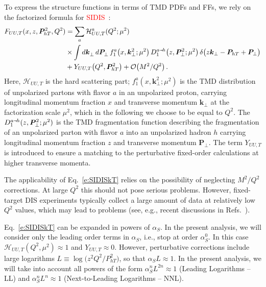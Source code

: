 \documentclass[aps,preprintnumbers,showpacs,nofootinbib,superscriptaddress,floatfix]{revtex4}
\newcommand{\smarrow}{\mbox{\raisebox{-4.5pt}[0pt][0pt]{$\hspace{-1pt} 
		\vec{\phantom{v}}$}}}
\newcommand{\T}{\perp}
\newcommand{\Tperp}{T}
\begin{document}
To express the structure functions in terms of TMD PDFs and FFs, 
we rely on the factorized formula 
for \textcolor{red}{SIDIS}~\cite{Collins:1981uk,Collins:1984kg,Ji:2002aa,Ji:2004wu,%
Collins:2011zzd,Aybat:2011zv,GarciaEchevarria:2011rb,Echevarria:2012pw,%
Collins:2012uy}:  
\begin{align}
\label{e:SIDISkT}
   F_{UU,T}(x,z, \bm{P}_{h \Tperp}^2, Q^2) &= \sum_a \mathcal{H}_{UU,T}^{a}(Q^2;\mu^2) \\ 
      &\times \int d\bm{k}_\T^{} \, d\bm{P}_\T^{} \,  f_1^a\big(x,\bm{k}_{\T}^2; \mu^2 \big) \, D_{1}^{a\smarrow h}\big(z,\bm{P}_{\T}^2; \mu^2 \big) \,
      \delta \big(z {\bm k}_{\T} - {\bm P}_{h \Tperp} + {\bm P}_{\T}\big)
\nonumber\\&
\nonumber + Y_{UU,T}\big(Q^2, \bm{P}_{h\Tperp}^2\big) + \mathcal{O}\big(M^2/Q^2\big) \, .
\end{align} 
Here, $\mathcal{H}_{UU,T}$ is the hard scattering part; $f_1^a(x,\bm{k}_{\T}^2;
\mu^2)$ is the TMD distribution of unpolarized partons with flavor $a$ in an unpolarized
proton, carrying longitudinal momentum fraction $x$ and transverse momentum
$\bm{k}_\T$ at the factorization scale $\mu^2$, which in the following we
choose to be equal to $Q^2$.  The $D_1^{a\smarrow h}(z, \bm{P}_{\T}^2;
\mu^2)$ is the TMD fragmentation function describing the fragmentation of an unpolarized parton with flavor $a$ into
an unpolarized hadron $h$ carrying longitudinal momentum fraction $z$ and
transverse momentum 
$\bm{P}_\T$. The term $Y_{UU,T}$ is introduced to ensure a matching
to the perturbative fixed-order calculations at higher transverse momenta. 

The applicability of Eq.~\eqref{e:SIDISkT} 
relies on the possibility of
neglecting $M^2/Q^2$ corrections.
At large $Q^2$ this should not pose serious
problems. However, fixed-target DIS experiments typically 
collect a large amount of data
at relatively low $Q^2$ values, which may lead to problems (see, e.g., recent
discussions in Refs.~\cite{Boglione:2016bph,Moffat:2017sha}).

 

Eq.~\eqref{e:SIDISkT} can be expanded in powers
of $\alpha_S$. In the present analysis, we 
will consider only the leading order terms in $\alpha_S$, i.e., stop at
order $\alpha_S^0$. In this case $\mathcal{H}_{UU,T} (Q^2, \mu^2) \approx 1$
and $Y_{UU,T}\approx 0$. 
However, perturbative corrections include large logarithms $L \equiv
\log\big(z^2 Q^2/P_{hT}^2\big)$, so that $\alpha_S L \approx 1$.
In the present analysis, we will take into account all 
powers of the form $\alpha_S^n L^{2n} \approx 1$ (Leading Logarithms --LL) 
and 
$\alpha_S^n L^n \approx 1$ (Next-to-Leading Logarithms -- NNL).
\end{document}
